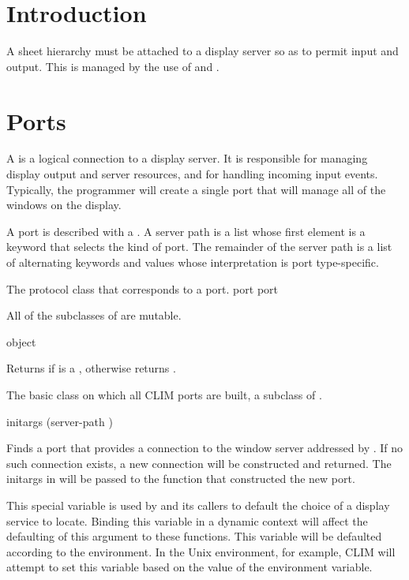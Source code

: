 \section {Introduction}

A sheet hierarchy must be attached to a display server so as to permit input and
output.  This is managed by the use of  and .

\section {Ports}

A  is a logical connection to a display server.  It is responsible
for managing display output and server resources, and for handling incoming
input events.  Typically, the programmer will create a single port that will
manage all of the windows on the display.

A port is described with a .  A server path is a list whose
first element is a keyword that selects the kind of port.  The remainder of the
server path is a list of alternating keywords and values whose interpretation is
port type-specific.


The protocol class that corresponds to a port.
 {port} {port}

All of the subclasses of  are mutable.

 {object}

Returns  if  is a , otherwise returns
.


The basic class on which all CLIM ports are built, a subclass of .
\AbstractClass


 {\rest initargs \key (server-path ) \allow}

Finds a port that provides a connection to the window server addressed by
.  If no such connection exists, a new connection will be
constructed and returned.  The initargs in  will be passed to the
function that constructed the new port.


This special variable is used by  and its callers to default the
choice of a display service to locate.  Binding this variable in a dynamic
context will affect the defaulting of this argument to these functions.  This
variable will be defaulted according to the environment.  In the Unix
environment, for example, CLIM will attempt to set this variable based on the
value of the  environment variable.

